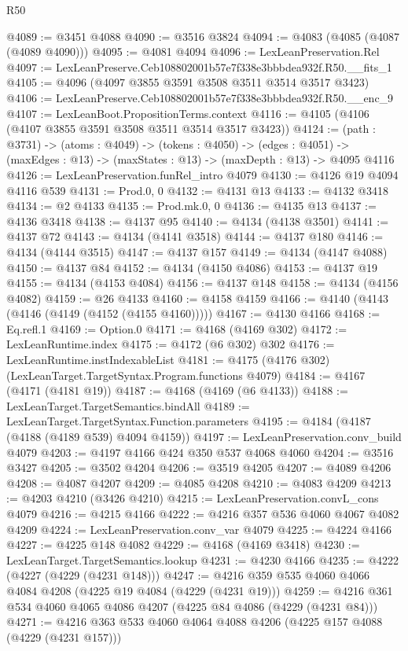 \begin{lexlean}{R50}
\begin{coremodule}
@4089 := @3451 @4088
@4090 := @3516 @3824
@4094 := @4083 (@4085 (@4087 (@4089 @4090)))
@4095 := @4081 @4094
@4096 := LexLeanPreservation.Rel
@4097 := LexLeanPreserve.Ceb108802001b57e7f338e3bbbdea932f.R50.__fits_1
@4105 := @4096 (@4097 @3855 @3591 @3508 @3511 @3514 @3517 @3423)
@4106 := LexLeanPreserve.Ceb108802001b57e7f338e3bbbdea932f.R50.__enc_9
@4107 := LexLeanBoot.PropositionTerms.context
@4116 := @4105 (@4106 (@4107 @3855 @3591 @3508 @3511 @3514 @3517 @3423))
@4124 := (path : @3731) ->
  (atoms : @4049) ->
  (tokens : @4050) ->
  (edges : @4051) -> (maxEdges : @13) -> (maxStates : @13) -> (maxDepth : @13) -> @4095 @4116
@4126 := LexLeanPreservation.funRel_intro @4079
@4130 := @4126 @19 @4094 @4116 @539
@4131 := Prod.{0, 0}
@4132 := @4131 @13
@4133 := @4132 @3418
@4134 := @2 @4133
@4135 := Prod.mk.{0, 0}
@4136 := @4135 @13
@4137 := @4136 @3418
@4138 := @4137 @95
@4140 := @4134 (@4138 @3501)
@4141 := @4137 @72
@4143 := @4134 (@4141 @3518)
@4144 := @4137 @180
@4146 := @4134 (@4144 @3515)
@4147 := @4137 @157
@4149 := @4134 (@4147 @4088)
@4150 := @4137 @84
@4152 := @4134 (@4150 @4086)
@4153 := @4137 @19
@4155 := @4134 (@4153 @4084)
@4156 := @4137 @148
@4158 := @4134 (@4156 @4082)
@4159 := @26 @4133
@4160 := @4158 @4159
@4166 := @4140 (@4143 (@4146 (@4149 (@4152 (@4155 @4160)))))
@4167 := @4130 @4166
@4168 := Eq.refl.{1}
@4169 := Option.{0}
@4171 := @4168 (@4169 @302)
@4172 := LexLeanRuntime.index
@4175 := @4172 (@6 @302) @302
@4176 := LexLeanRuntime.instIndexableList
@4181 := @4175 (@4176 @302) (LexLeanTarget.TargetSyntax.Program.functions @4079)
@4184 := @4167 (@4171 (@4181 @19))
@4187 := @4168 (@4169 (@6 @4133))
@4188 := LexLeanTarget.TargetSemantics.bindAll
@4189 := LexLeanTarget.TargetSyntax.Function.parameters
@4195 := @4184 (@4187 (@4188 (@4189 @539) @4094 @4159))
@4197 := LexLeanPreservation.conv_build @4079
@4203 := @4197 @4166 @424 @350 @537 @4068 @4060
@4204 := @3516 @3427
@4205 := @3502 @4204
@4206 := @3519 @4205
@4207 := @4089 @4206
@4208 := @4087 @4207
@4209 := @4085 @4208
@4210 := @4083 @4209
@4213 := @4203 @4210 (@3426 @4210)
@4215 := LexLeanPreservation.convL_cons @4079
@4216 := @4215 @4166
@4222 := @4216 @357 @536 @4060 @4067 @4082 @4209
@4224 := LexLeanPreservation.conv_var @4079
@4225 := @4224 @4166
@4227 := @4225 @148 @4082
@4229 := @4168 (@4169 @3418)
@4230 := LexLeanTarget.TargetSemantics.lookup
@4231 := @4230 @4166
@4235 := @4222 (@4227 (@4229 (@4231 @148)))
@4247 := @4216 @359 @535 @4060 @4066 @4084 @4208 (@4225 @19 @4084 (@4229 (@4231 @19)))
@4259 := @4216 @361 @534 @4060 @4065 @4086 @4207 (@4225 @84 @4086 (@4229 (@4231 @84)))
@4271 := @4216 @363 @533 @4060 @4064 @4088 @4206 (@4225 @157 @4088 (@4229 (@4231 @157)))

\end{coremodule}
\end{lexlean}
